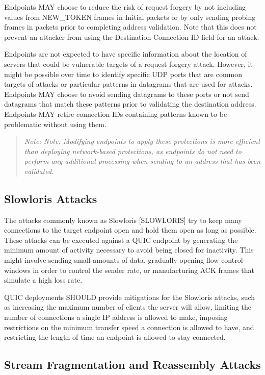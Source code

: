 \documentclass{article}
\begin{document}
Endpoints MAY choose to reduce the risk of request forgery by not including values from NEW\_TOKEN frames in Initial packets or by only sending probing frames in packets prior to completing address validation.  Note that this does not prevent an attacker from using the Destination Connection ID field for an attack.

Endpoints are not expected to have specific information about the location of servers that could be vulnerable targets of a request forgery attack.  However, it might be possible over time to identify specific UDP ports that are common targets of attacks or particular patterns in datagrams that are used for attacks.  Endpoints MAY choose to avoid sending datagrams to these ports or not send datagrams that match these patterns prior to validating the destination address.  Endpoints MAY retire connection IDs containing patterns known to be problematic without using them.

\begin{quote}
\textit{Note: Note: Modifying endpoints to apply these protections is more efficient than deploying network-based protections, as endpoints do not need to perform any additional processing when sending to an address that has been validated.}
\end{quote}

\subsection{Slowloris Attacks}

The attacks commonly known as Slowloris [SLOWLORIS] try to keep many connections to the target endpoint open and hold them open as long as possible.  These attacks can be executed against a QUIC endpoint by generating the minimum amount of activity necessary to avoid being closed for inactivity.  This might involve sending small amounts of data, gradually opening flow control windows in order to control the sender rate, or manufacturing ACK frames that simulate a high loss rate.

QUIC deployments SHOULD provide mitigations for the Slowloris attacks, such as increasing the maximum number of clients the server will allow, limiting the number of connections a single IP address is allowed to make, imposing restrictions on the minimum transfer speed a connection is allowed to have, and restricting the length of time an endpoint is allowed to stay connected.

\subsection{Stream Fragmentation and Reassembly Attacks}
\end{document}
